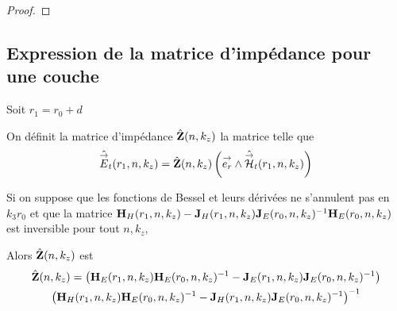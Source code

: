 \begin{proof}


  \end{proof}



  \subsection{Expression de la matrice d'impédance pour une couche}

    Soit \(r_1 = r_0 + d\)
    \begin{defn}
      On définit la matrice d'impédance \(\hat {\mathbf{Z}}(n,k_z)\) la matrice telle que
      \begin{equation}
        \hat {{\overset{\rightarrow}{E}}}_t(r_1,n,k_z) = \hat {\mathbf{Z}}(n,k_z) \left({\overset{\rightarrow}{e_r}}\wedge \hat {{\overset{\rightarrow}{\mathcal{H}}}}_t(r_1,n,k_z)\right)
      \end{equation}
    \end{defn}

    \begin{thm}
      Si on suppose que les fonctions de Bessel et leurs dérivées ne s’annulent pas en \(k_3r_0\) et que
      la matrice \(\mathbf{H}_{H}(r_1,n,k_z) - \mathbf{J}_{H}(r_1,n,k_z)\mathbf{J}_{E}(r_0,n,k_z)^{-1}\mathbf{H}_{E}(r_0,n,k_z)\) est inversible pour tout \(n,k_z\),

      Alors \(\hat {\mathbf{Z}}(n,k_z)\) est
      \begin{multline}
        \hat {\mathbf{Z}}(n,k_z) =
        \left(\mathbf{H}_{E}(r_1,n,k_z)\mathbf{H}_{E}(r_0,n,k_z)^{-1} - \mathbf{J}_{E}(r_1,n,k_z)\mathbf{J}_{E}(r_0,n,k_z)^{-1}\right)\\
        \left(\mathbf{H}_{H}(r_1,n,k_z)\mathbf{H}_{E}(r_0,n,k_z)^{-1} - \mathbf{J}_{H}(r_1,n,k_z)\mathbf{J}_{E}(r_0,n,k_z)^{-1}\right)^{-1}
      \end{multline}
    \end{thm}

